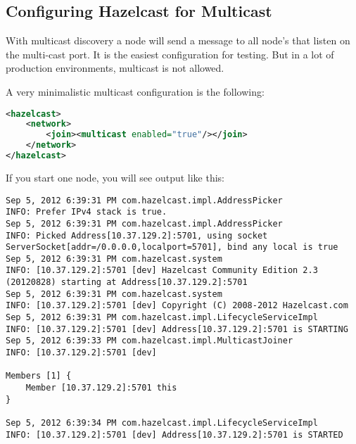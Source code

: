 \subsection{Configuring Hazelcast for Multicast}

With multicast discovery a node will send a message to all node's that listen on the multi-cast port. It is the easiest configuration for testing. But in a lot of production environments, multicast is not allowed.

A very minimalistic multicast configuration is the following:
\begin{lstlisting}[language=xml]
<hazelcast>
    <network>
        <join><multicast enabled="true"/></join>
    </network>
</hazelcast>
\end{lstlisting}

If you start one node, you will see output like this:
\begin{lstlisting}
Sep 5, 2012 6:39:31 PM com.hazelcast.impl.AddressPicker
INFO: Prefer IPv4 stack is true.
Sep 5, 2012 6:39:31 PM com.hazelcast.impl.AddressPicker
INFO: Picked Address[10.37.129.2]:5701, using socket ServerSocket[addr=/0.0.0.0,localport=5701], bind any local is true
Sep 5, 2012 6:39:31 PM com.hazelcast.system
INFO: [10.37.129.2]:5701 [dev] Hazelcast Community Edition 2.3 (20120828) starting at Address[10.37.129.2]:5701
Sep 5, 2012 6:39:31 PM com.hazelcast.system
INFO: [10.37.129.2]:5701 [dev] Copyright (C) 2008-2012 Hazelcast.com
Sep 5, 2012 6:39:31 PM com.hazelcast.impl.LifecycleServiceImpl
INFO: [10.37.129.2]:5701 [dev] Address[10.37.129.2]:5701 is STARTING
Sep 5, 2012 6:39:33 PM com.hazelcast.impl.MulticastJoiner
INFO: [10.37.129.2]:5701 [dev] 

Members [1] {
    Member [10.37.129.2]:5701 this
}

Sep 5, 2012 6:39:34 PM com.hazelcast.impl.LifecycleServiceImpl
INFO: [10.37.129.2]:5701 [dev] Address[10.37.129.2]:5701 is STARTED
\end{lstlisting}	

